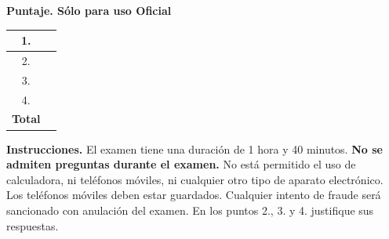 \documentclass[11pt]{article}
\begin{document}
\examheader

\vspace{4pt}
\noindent
\begin{minipage}[t]{0.62\linewidth}
\textbf{Puntaje. Sólo para uso Oficial}\\[4pt]
\begin{tabular}{|c|c|}
\hline
1. & \\ \hline
2. & \\ \hline
3. & \\ \hline
4. & \\ \hline
\textbf{Total} & \\ \hline
\end{tabular}
\end{minipage}

\vspace{6pt}
\noindent\textbf{Instrucciones.} El examen tiene una duración de 1 hora y 40 minutos. \textbf{No se admiten preguntas durante el examen.} No está permitido el uso de calculadora, ni teléfonos móviles, ni cualquier otro tipo de aparato electrónico. Los teléfonos móviles deben estar guardados. Cualquier intento de fraude será sancionado con anulación del examen. En los puntos 2., 3. y 4. justifique sus respuestas.
\end{document}

